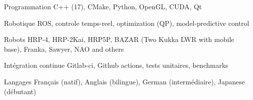 

\begin{cvskills}

  \cvskill
    {Programmation} %
    {C++ (17), CMake, Python, OpenGL, CUDA, Qt} %

  \cvskill
    {Robotique} %
    {ROS, controle temps-reel, optimization (QP), model-predictive control} %

  \cvskill
    {Robots} %
    {HRP-4, HRP-2Kai, HRP5P, BAZAR (Two Kukka LWR with mobile base), Franka, Sawyer, NAO and others} %

  \cvskill
    {Intégration continue} %
    {Gitlab-ci, Github actions, tests unitaires, benchmarks} %


  \cvskill
    {Langages} %
    {Français (natif), Anglais (bilingue), German (intermédiaire), Japanese (débutant)} %
\end{cvskills}
